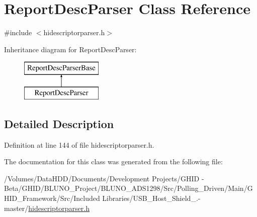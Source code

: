 \hypertarget{class_report_desc_parser}{\section{\-Report\-Desc\-Parser \-Class \-Reference}
\label{class_report_desc_parser}
}


{\ttfamily \#include $<$hidescriptorparser.\-h$>$}

\-Inheritance diagram for \-Report\-Desc\-Parser\-:\begin{figure}[H]
\begin{center}
\leavevmode
\includegraphics[height=2.000000cm]{class_report_desc_parser}
\end{center}
\end{figure}


\subsection{\-Detailed \-Description}


\-Definition at line 144 of file hidescriptorparser.\-h.



\-The documentation for this class was generated from the following file\-:\begin{DoxyCompactItemize}
\item 
/\-Volumes/\-Data\-H\-D\-D/\-Documents/\-Development Projects/\-G\-H\-I\-D -\/ Beta/\-G\-H\-I\-D/\-B\-L\-U\-N\-O\-\_\-\-Project/\-B\-L\-U\-N\-O\-\_\-\-A\-D\-S1298/\-Src/\-Polling\-\_\-\-Driven/\-Main/\-G\-H\-I\-D\-\_\-\-Framework/\-Src/\-Included Libraries/\-U\-S\-B\-\_\-\-Host\-\_\-\-Shield\-\_.-\/master/\hyperlink{hidescriptorparser_8h}{hidescriptorparser.\-h}\end{DoxyCompactItemize}
